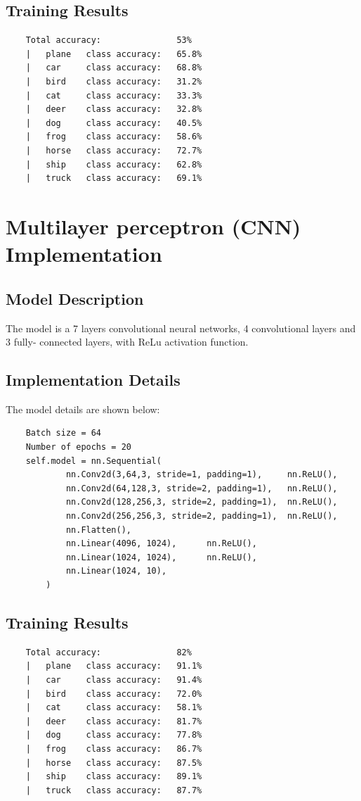 \documentclass[11pt,letterpaper]{article}
\numberwithin{equation}{section}
\begin{document}
\subsection{Training Results}
\begin{lstlisting}
    Total accuracy:               53%
    |   plane   class accuracy:   65.8%
    |   car     class accuracy:   68.8%
    |   bird    class accuracy:   31.2%
    |   cat     class accuracy:   33.3%
    |   deer    class accuracy:   32.8%
    |   dog     class accuracy:   40.5%
    |   frog    class accuracy:   58.6%
    |   horse   class accuracy:   72.7%
    |   ship    class accuracy:   62.8%
    |   truck   class accuracy:   69.1%
\end{lstlisting}


\newpage

\section{Multilayer perceptron (CNN) Implementation}
\subsection{Model Description}
The model is a 7 layers convolutional neural networks, 4 convolutional layers and 3 fully-
connected layers, with ReLu activation function.
\subsection{Implementation Details}
The model details are shown below:
\begin{lstlisting}
    Batch size = 64
    Number of epochs = 20
    self.model = nn.Sequential(
            nn.Conv2d(3,64,3, stride=1, padding=1),     nn.ReLU(),
            nn.Conv2d(64,128,3, stride=2, padding=1),   nn.ReLU(),
            nn.Conv2d(128,256,3, stride=2, padding=1),  nn.ReLU(),
            nn.Conv2d(256,256,3, stride=2, padding=1),  nn.ReLU(),
            nn.Flatten(),
            nn.Linear(4096, 1024),      nn.ReLU(),
            nn.Linear(1024, 1024),      nn.ReLU(),
            nn.Linear(1024, 10),
        )
\end{lstlisting}

\subsection{Training Results}
\begin{lstlisting}
    Total accuracy:               82%
    |   plane   class accuracy:   91.1%
    |   car     class accuracy:   91.4%
    |   bird    class accuracy:   72.0%
    |   cat     class accuracy:   58.1%
    |   deer    class accuracy:   81.7%
    |   dog     class accuracy:   77.8%
    |   frog    class accuracy:   86.7%
    |   horse   class accuracy:   87.5%
    |   ship    class accuracy:   89.1%
    |   truck   class accuracy:   87.7%
\end{lstlisting}
\end{document}
